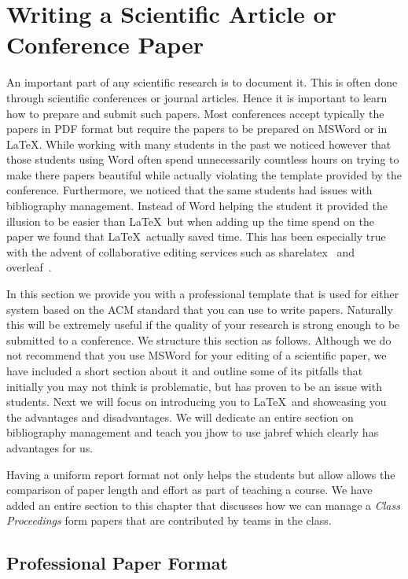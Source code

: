 \FILENAME

\section{Writing a Scientific Article or Conference Paper}
\label{S:writing}

An important part of any scientific research is to document it. This
is often done through scientific conferences or journal
articles. Hence it is important to learn how to prepare and submit
such papers. Most conferences accept typically the papers in PDF
format but require the papers to be prepared on MSWord or in
\LaTeX. While working with many students in the past we noticed
however that those students using Word often spend unnecessarily
countless hours on trying to make there papers beautiful while
actually violating the template provided by the
conference. Furthermore, we noticed that the same students had issues
with bibliography management. Instead of Word helping the student it
provided the illusion to be easier than \LaTeX~but when adding up the
time spend on the paper we found that \LaTeX~actually saved time. This
has been especially true with the advent of collaborative editing
services such as sharelatex~\cite{www-sharelatex} and
overleaf~\cite{www-overleaf}.

In this section we provide you with a professional template that is used
for either system based on the ACM standard that you can use to write
papers. Naturally this will be extremely useful if the quality of your
research is strong enough to be submitted to a conference. We structure
this section as follows. Although we do not recommend that you use
MSWord for your editing of a scientific paper, we have included a short
section about it and outline some of its pitfalls that initially you may
not think is problematic, but has proven to be an issue with students.
Next we will focus on introducing you to \LaTeX~and showcasing you the
advantages and disadvantages. We will dedicate an entire section on
bibliography management and teach you jhow to use jabref which clearly
has advantages for us.

Having a uniform report format not only helps the students but allow
allows the comparison of paper length and effort as part of teaching a
course. We have added an entire section to this chapter that discusses
how we can manage a \emph{Class Proceedings} form papers that are
contributed by teams in the class.

\subsection{Professional Paper Format}\label{professional-paper-format}

